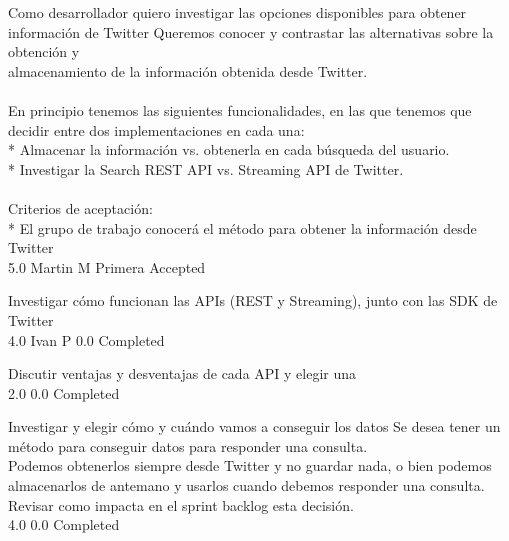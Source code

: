 	{Como desarrollador quiero investigar las opciones disponibles para obtener información de Twitter} %
	{Queremos conocer y contrastar las alternativas sobre la obtención y\\
almacenamiento de la información obtenida desde Twitter.\\
  \\
En principio tenemos las siguientes funcionalidades, en las que tenemos que\\
decidir entre dos implementaciones en cada una:\\
* Almacenar la información vs. obtenerla en cada búsqueda del usuario.\\
* Investigar la Search REST API vs. Streaming API de Twitter.\\
  \\
Criterios de aceptación:\\
* El grupo de trabajo conocerá el método para obtener la información desde Twitter  \\
} %
	{} %
	{5.0} %
	{Martin M} %
	{Primera} %
	{Accepted} %

		{Investigar cómo funcionan las APIs (REST y Streaming), junto con las SDK de Twitter} %
		{\\
} %
		{4.0} %
		{Ivan P} %
		{0.0} %
		{Completed} %

		{Discutir ventajas y desventajas de cada API y elegir una} %
		{\\
} %
		{2.0} %
		{} %
		{0.0} %
		{Completed} %

		{Investigar y elegir cómo y cuándo vamos a conseguir los datos} %
		{Se desea tener un método para conseguir datos para responder una consulta.\\
Podemos obtenerlos siempre desde Twitter y no guardar nada, o bien podemos\\
almacenarlos de antemano y usarlos cuando debemos responder una consulta.\\
Revisar como impacta en el sprint backlog esta decisión.\\
} %
		{4.0} %
		{} %
		{0.0} %
		{Completed} %


